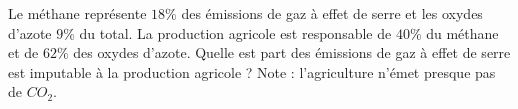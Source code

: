 
\begin{exercice}\label{exosmath-0558}

    Le méthane représente \( 18\%\) des émissions de gaz à effet de serre et les oxydes d'azote \( 9\%\) du total. La production agricole est responsable de \( 40\%\) du méthane et de \( 62\%\) des oxydes d'azote. Quelle est part des émissions de gaz à effet de serre est imputable à la production agricole ? Note : l'agriculture n'émet presque pas de \( CO_2\).

\end{exercice}
